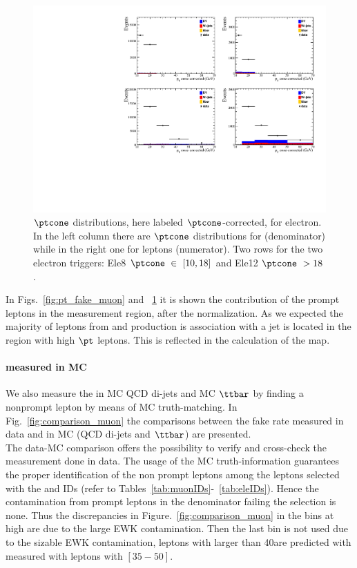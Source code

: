 \begin{figure}[h!]
\centering
\includegraphics[width=.7\textwidth]{Figures/c5/FAKE/pt_cone_ele.pdf}
\caption{$\ptcone$ distributions, here labeled $\ptcone$-corrected,
  for electron. In the left column there are $\ptcone$ distributions
  for \fo  (denominator) while in the
  right one for \ti  leptons (numerator). Two
  rows for the two electron triggers: Ele8 $\ptcone \ \in \ [10,18]$\GeV
  and Ele12 $\ptcone \ > 18$\GeV.}
\label{fig:pt_fake_ele}
\end{figure}

In Figs.~\ref{fig:pt_fake_muon} and ~\ref{fig:pt_fake_ele} it is shown
the contribution of the prompt leptons in the measurement region, after
the normalization. As we expected the majority of leptons from \PW and
\PZ production is association with a jet is located in the region with
high $\pt$ leptons. This is
reflected in the calculation of the \fr map.

\paragraph{\fr measured in MC}
We also measure the \fr in MC QCD di-jets and MC $\ttbar$ by
finding a nonprompt lepton by means of MC truth-matching. In
Fig.~\ref{fig:comparison_muon} the comparisons between the fake rate
measured in data and in MC (QCD di-jets and $\ttbar$)  are
presented.\\
The data-MC comparison offers the possibility to verify and cross-check the
measurement done in data. The usage of the MC truth-information
guarantees the proper identification of the non prompt leptons among
the leptons selected with the \fo and \ti  IDs (refer to
Tables~\ref{tab:muonIDs}-~\ref{tab:eleIDs}). Hence the contamination
from prompt leptons in the denominator failing the \ti  selection is
none. Thus the discrepancies in Figure.~\ref{fig:comparison_muon} in the
bins at high \pt are due to the large EWK contamination. Then the last
bin is not used due to the sizable EWK contamination, leptons with \pt
larger than 40\GeV are predicted with \fr measured with leptons
with \pt $[35-50]$\GeV.

